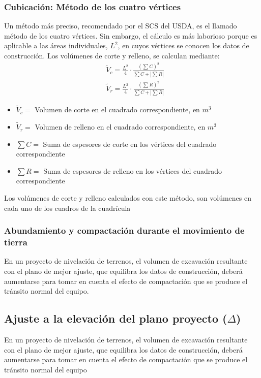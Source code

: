 \subsubsection{Cubicación: Método de los cuatro vértices}
Un método más preciso, recomendado por el SCS del USDA, es el llamado método de los cuatro vértices. Sin embargo, el cálculo es más laborioso porque es aplicable a las áreas individuales, $L^2$, en cuyos vértices se conocen los datos de construcción. Los volúmenes de corte y relleno, se calculan mediante:
\begin{align}
  &\tilde{V}_c = \frac{L^2}{4}\cdot \frac{\left(\sum C\right)^2}{\sum C + \left\lvert \sum R\right\rvert }\\
  &\tilde{V}_r = \frac{L^2}{4}\cdot \frac{\left(\sum R\right)^2}{\sum C + \left\lvert \sum R\right\rvert }
\end{align}
\begin{notation}
  \begin{itemize}
    \item $\tilde{V}_c=$ Volumen de corte en el cuadrado correspondiente, en $m^3$
    \item $\tilde{V}_r=$ Volumen de relleno en el cuadrado correspondiente, en $m^3$
    \item $\sum C=$ Suma de espesores de corte en los vértices del cuadrado correspondiente
    \item $\sum R=$ Suma de espesores de relleno en los vértices del cuadrado correspondiente
  \end{itemize}
\end{notation}
Los volúmenes de corte y relleno calculados con este método, son volúmenes en cada uno de los cuadros de la cuadrícula
\subsubsection{Abundamiento y compactación durante el movimiento de tierra}
En un proyecto de nivelación de terrenos, el volumen de excavación resultante con el plano de mejor ajuste, que equilibra los datos de construcción, deberá aumentarse para tomar en cuenta el efecto de compactación que se produce el tránsito normal del equipo.

\subsection{Ajuste a la elevación del plano proyecto ($\Delta$)}
En un proyecto de nivelación de terrenos, el volumen de excavación resultante con el plano de mejor ajuste, que equilibra los datos de construcción, deberá aumentarse para tomar en cuenta el efecto de compactación que se produce el tránsito normal del equipo

